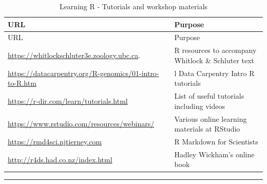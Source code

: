 \documentclass[
]{book}
\begin{document}
\begin{longtable}[]{@{}
  >{\raggedright\arraybackslash}p{}
  >{\raggedright\arraybackslash}p{}@{}}
\caption{Learning R - Tutorials and workshop materials}\tabularnewline
\toprule\noalign{}
\begin{minipage}[b]{\linewidth}\raggedright
URL
\end{minipage} & \begin{minipage}[b]{\linewidth}\raggedright
Purpose
\end{minipage} \\
\midrule\noalign{}
\endfirsthead
\toprule\noalign{}
\begin{minipage}[b]{\linewidth}\raggedright
URL
\end{minipage} & \begin{minipage}[b]{\linewidth}\raggedright
Purpose
\end{minipage} \\
\midrule\noalign{}
\endhead
\bottomrule\noalign{}
\endlastfoot
\url{https://whitlockschluter3e.zoology.ubc.ca}. & R resources to accompany Whitlock \& Schluter text \\
\url{https://datacarpentry.org/R-genomics/01-intro-to-R.htm} & l Data Carpentry Intro R tutorials \\
\url{https://r-dir.com/learn/tutorials.html} & List of useful tutorials including videos \\
\url{https://www.rstudio.com/resources/webinars/} & Various online learning materials at RStudio \\
\url{https://rmd4sci.njtierney.com} & R Markdown for Scientists \\
\url{http://r4ds.had.co.nz/index.html} & Hadley Wickham's online book \\
\end{longtable}

\begin{center}\rule{0.5\linewidth}{0.5pt}\end{center}
\end{document}
